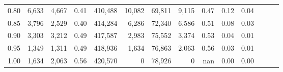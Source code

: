 \begin{tabular}{rrrrrrrrrrrrrr}
0.80 &   6,633 &   4,667 &  0.41 &  410,488 &   10,082 &  69,811 &   9,115 &  0.47 &  0.12 &      0.04 \\
0.85 &   3,796 &   2,529 &  0.40 &  414,284 &    6,286 &  72,340 &   6,586 &  0.51 &  0.08 &      0.03 \\
0.90 &   3,303 &   3,212 &  0.49 &  417,587 &    2,983 &  75,552 &   3,374 &  0.53 &  0.04 &      0.01 \\
0.95 &   1,349 &   1,311 &  0.49 &  418,936 &    1,634 &  76,863 &   2,063 &  0.56 &  0.03 &      0.01 \\
1.00 &   1,634 &   2,063 &  0.56 &  420,570 &        0 &  78,926 &       0 &   nan &  0.00 &      0.00 \\
\bottomrule
\end{tabular}
